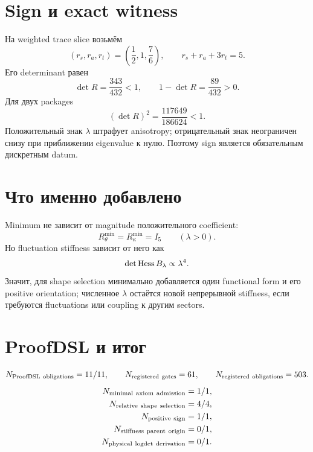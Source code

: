 \section{Sign и exact witness}

На weighted trace slice возьмём
\begin{equation}
 (r_s,r_a,r_t)=\left(\frac12,1,\frac76\right),
 \qquad r_s+r_a+3r_t=5.
 \label{eq:v9-kms-axiom-sign-witness}
\end{equation}
Его determinant равен
\begin{equation}
 \det R=\frac{343}{432}<1,
 \qquad 1-\det R=\frac{89}{432}>0.
 \label{eq:v9-kms-axiom-witness-determinant}
\end{equation}
Для двух packages
\begin{equation}
 (\det R)^2=\frac{117649}{186624}<1.
 \label{eq:v9-kms-axiom-doubled-witness}
\end{equation}
Положительный знак $\lambda$ штрафует anisotropy; отрицательный знак
неограничен снизу при приближении eigenvalue к нулю. Поэтому sign является
обязательным дискретным datum.

\section{Что именно добавлено}

Minimum не зависит от magnitude положительного coefficient:
\begin{equation}
 R_\theta^{\min}=R_\kappa^{\min}=I_5
 \qquad (\lambda>0).
 \label{eq:v9-kms-axiom-minimum}
\end{equation}
Но fluctuation stiffness зависит от него как
\begin{equation}
 \det\operatorname{Hess} B_\lambda\propto\lambda^4.
 \label{eq:v9-kms-axiom-stiffness}
\end{equation}
Значит, для shape selection минимально добавляется один functional form и
его positive orientation; численное $\lambda$ остаётся новой непрерывной
stiffness, если требуются fluctuations или coupling к другим sectors.

\section{ProofDSL и итог}

\begin{equation}
 N_{\rm ProofDSL\ obligations}=11/11,
 \qquad N_{\rm registered\ gates}=61,
 \qquad N_{\rm registered\ obligations}=503.
 \label{eq:v9-kms-axiom-proofdsl}
\end{equation}
\begin{equation}
 \begin{aligned}
 N_{\rm minimal\ axiom\ admission}&=1/1,\\
 N_{\rm relative\ shape\ selection}&=4/4,\\
 N_{\rm positive\ sign}&=1/1,\\
 N_{\rm stiffness\ parent\ origin}&=0/1,\\
 N_{\rm physical\ logdet\ derivation}&=0/1.
 \end{aligned}
 \label{eq:v9-kms-axiom-ledger}
\end{equation}

